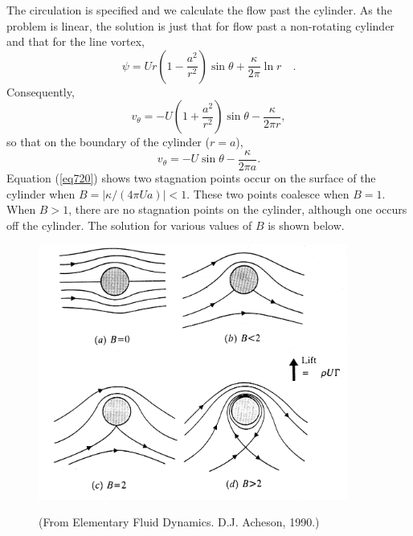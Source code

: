 \documentclass[10pt]{report}
\begin{document}
The circulation is specified and we calculate the flow past the cylinder. As
the problem is linear, the solution is just that for flow past a
non-rotating cylinder and that for the line vortex,
\begin{equation}
\label{eq718}
\psi =Ur\left( {1-\frac{a^2}{r^2}} \right)\sin \theta +\frac{\kappa }{2\pi
}\ln r\quad .
\end{equation}
Consequently,
\[ v_\theta =-U\left( {1+\frac{a^2}{r^2}} \right)\sin \theta
-\frac{\kappa }{2\pi r}, \label{eq719} \]
so that on the boundary of the cylinder ($r = a$),
\begin{equation}
v_\theta =-U\sin \theta
-\frac{\kappa }{2\pi a}. \label{eq720} \end{equation}
Equation (\ref{eq720}) shows two stagnation points occur on the surface of the
cylinder when $B=\left| {\kappa / {\left( {4\pi Ua}
\right)}} \right|<1$. These two points coalesce when $B = 1$. When $B > 1$,
there are no stagnation points on the cylinder, although one occurs off the
cylinder. The solution for various values of $B$ is shown below.

\begin{figure}[htbp]
\centerline{\includegraphics[width=4in]{Section77.pdf}}
{\small (From Elementary Fluid Dynamics. D.J. Acheson, 1990.)}
\caption{ }
\label{fig4.7}
\end{figure}
\end{document}
